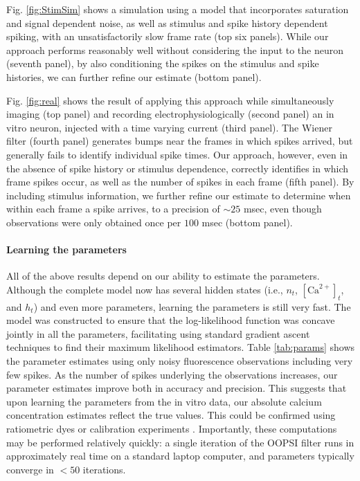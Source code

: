 \documentclass[12pt]{article}
\newcommand{\Ca}{[\text{Ca}^{2+}]}
\begin{document}
Fig. \ref{fig:StimSim} shows a simulation using a model that incorporates saturation and signal dependent noise, as well as stimulus and spike history dependent spiking, with an unsatisfactorily slow frame rate (top six panels). While our approach performs reasonably well without considering the input to the neuron (seventh panel), by also conditioning the spikes on the stimulus and spike histories, we can further refine our estimate (bottom panel).  

Fig. \ref{fig:real} shows the result of applying this approach while simultaneously imaging (top panel) and recording electrophysiologically (second panel) an in vitro neuron, injected with a time varying current (third panel).  The Wiener filter (fourth panel) generates bumps near the frames in which spikes arrived, but generally fails to identify individual spike times.  Our approach, however, even in the absence of spike history or stimulus dependence, correctly identifies in which frame spikes occur, as well as the number of spikes in each frame (fifth panel).  By including stimulus information, we further refine our estimate to determine when within each frame a spike arrives, to a precision of $\sim 25$ msec, even though observations were only obtained once per $100$ msec (bottom panel).%

\paragraph{Learning the parameters}

All of the above results depend on our ability to estimate the parameters. Although the complete model now has several hidden states (i.e., $n_t$, $\Ca_t$, and $h_t$) and even more parameters, learning the parameters is still very fast. The model was constructed to ensure that the log-likelihood function was concave jointly in all the parameters, facilitating using standard gradient ascent techniques to find their maximum likelihood estimators. Table \ref{tab:params} shows the parameter estimates using only noisy fluorescence observations including very few spikes. As the number of spikes underlying the observations increases, our parameter estimates improve both in accuracy and precision.  This suggests that upon learning the parameters from the in vitro data, our absolute calcium concentration estimates reflect the true values.  This could be confirmed using ratiometric dyes or calibration experiments \cite{YasudaSvoboda04}. Importantly, these computations may be performed relatively quickly: a single iteration of the OOPSI filter runs in approximately real time on a standard laptop computer, and parameters typically converge in $<50$ iterations.
\end{document}

